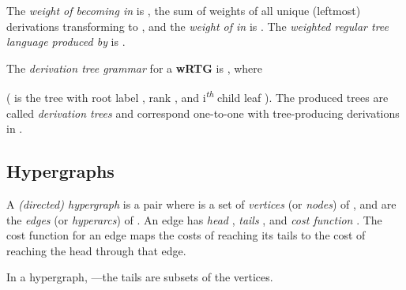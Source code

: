 \documentclass[english]{article}
\newcommand\comment[1]{}
\newcommand{\nth}[2]{#1\textsuperscript{\textit{#2}}}
\newcommand\cls[1]{\textbf{#1}}
\begin{document}
  The \emph{weight of  becoming  in } is , the sum of weights of all unique
  (leftmost) derivations transforming  to , and the \emph{weight of  in } is
  .  The \emph{weighted regular tree language produced by
    } is .

  The \emph{derivation tree grammar} for a \cls{wRTG}  is , where
  
  ( is the tree with root label , rank , and \nth{i}{th} child leaf ).  The produced trees are called \emph{derivation trees} and correspond one-to-one with tree-producing derivations in .




\comment{
  \subsection{Unordered Trees}

  Just like a multiset is a sequence where we don't care about the order of its
  elements, we can consider trees where we don't care about the order of
  children. Call  the set of \emph{(rooted, labeled, finite) unordered trees
    over alphabet }.

  The root's label is \emph{}; its rank would be
  ).  Paths are not defined for unordered trees, but, as
  with ordered trees, we are interested in the subtrees descended along paths
  labeled by a monadic string, :
  
  As for ordered trees, we let  be a multiset (instead of a sequence) with
  multiplicity for  .
\comment{
Similarly, we define .
}

  An ordered tree  can be interpreted as an unordered tree  by the recursive
  rule  that 
  (sequence interpreted as a multiset).  Then, properties related to monadic
  strings  of  should be the same multiset in the ordered  as in
  ---for example, .
}

  \subsection{Hypergraphs}

  A \emph{(directed) hypergraph } is a pair  where  is a set
  of \emph{vertices} (or \emph{nodes}) of , and  are the \emph{edges} (or
  \emph{hyperarcs}) of .  An edge
   has \emph{head
    }, \emph{tails }, and \emph{cost function }.  The cost
  function for an edge maps the costs of reaching its tails to the cost of
  reaching the head through that edge.

  In a hypergraph, ---the tails are subsets of the vertices.
\end{document}

